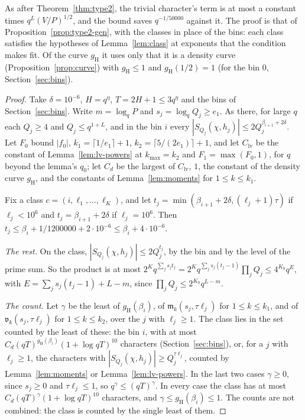 \documentclass[11pt]{article}
\theoremstyle{definition}
\begin{document}
As after Theorem~\ref{thm:type2}, the trivial character's term is at most a constant times $q^L(V/P)^{1/2}$, and the
bound saves $q^{-1/50000}$ against it. The proof is that of Proposition~\ref{prop:type2-gen}, with the classes in place
of the bins: each class satisfies the hypotheses of Lemma~\ref{lem:class} at exponents that the condition makes fit.
Of the curve $g_{\mathrm H}$ it uses only that it is a density curve (Proposition~\ref{prop:curve}) with $g_{\mathrm H}
\le 1$ and $g_{\mathrm H}(1/2) = 1$ (for the bin $0$, Section~\ref{sec:bins}).

\begin{proof}
Take $\delta = 10^{-6}$, $H = q^\eta$, $T = 2H + 1 \le 3q^\eta$ and the bins of Section~\ref{sec:bins}. Write $m =
\log_q P$ and $s_j = \log_q Q_j \ge e_1$. As there, for large $q$ each $Q_j \ge 4$ and $Q_j \le q^{1 + L}$, and in the
bin $i$ every $|S_{Q_j}(\chi, h_j)| \le 2Q_j^{\beta_{i+1} + 2\delta}$. Let $F_0$ bound $|f_0|$, $k_1 = \lceil 1/e_1
\rceil + 1$, $k_2 = \lceil 5/(2e_1) \rceil + 1$, and let $C_{\mathrm{lv}}$ be the constant of
Lemma~\ref{lem:lv-powers} at $k_{\max} = k_2$ and $F_1 = \max(F_0, 1)$, for $q$ beyond the lemma's $q_0$; let $C_d$ be
the largest of $C_{\mathrm{lv}}$, $1$, the constant of the density curve $g_{\mathrm H}$, and the constants of
Lemma~\ref{lem:moments} for $1 \le k \le k_1$.

Fix a class $c = (i, \ell_1, \dots, \ell_K)$, and let $t_j = \min(\beta_{i+1} + 2\delta, (\ell_j + 1)\tau)$ if
$\ell_j < 10^6$ and $t_j = \beta_{i+1} + 2\delta$ if $\ell_j = 10^6$. Then $t_j \le \beta_i + 1/1200000 + 2 \cdot
10^{-6} \le \beta_i + 4 \cdot 10^{-6}$.

\emph{The rest.} On the class, $|S_{Q_j}(\chi, h_j)| \le 2Q_j^{t_j}$, by the bin and by the level of the prime sum. So
the product is
at most $2^K q^{\sum_j s_j t_j} = 2^K q^{\sum_j s_j(t_j - 1)} \prod_j Q_j \le 4^{K_0} q^E$, with $E = \sum_j s_j(t_j -
1) + L - m$, since $\prod_j Q_j \le 2^{K_0} q^{L - m}$.

\emph{The count.} Let $\gamma$ be the least of $g_{\mathrm H}(\beta_i)$, of $\mathfrak m_k(s_j, \tau\ell_j)$ for $1 \le
k \le k_1$, and of $\mathfrak v_k(s_j, \tau\ell_j)$ for $1 \le k \le k_2$, over the $j$ with $\ell_j \ge 1$. The class
lies in the set counted by the least of these: the bin $i$, with at most $C_d (qT)^{g_{\mathrm H}(\beta_i)} (1 + \log
qT)^{10}$ characters (Section~\ref{sec:bins}), or, for a $j$ with $\ell_j \ge 1$, the characters with $|S_{Q_j}(\chi,
h_j)| \ge Q_j^{\tau\ell_j}$, counted by Lemma~\ref{lem:moments} or Lemma~\ref{lem:lv-powers}. In the last two cases
$\gamma \ge 0$, since $s_j \ge 0$ and $\tau\ell_j \le 1$, so $q^\gamma \le (qT)^\gamma$. In every case the class has
at most $C_d (qT)^\gamma (1 + \log qT)^{10}$ characters, and $\gamma \le g_{\mathrm H}(\beta_i) \le 1$. The counts are
not combined: the class is counted by the single least of them.


\end{proof}
\end{document}
